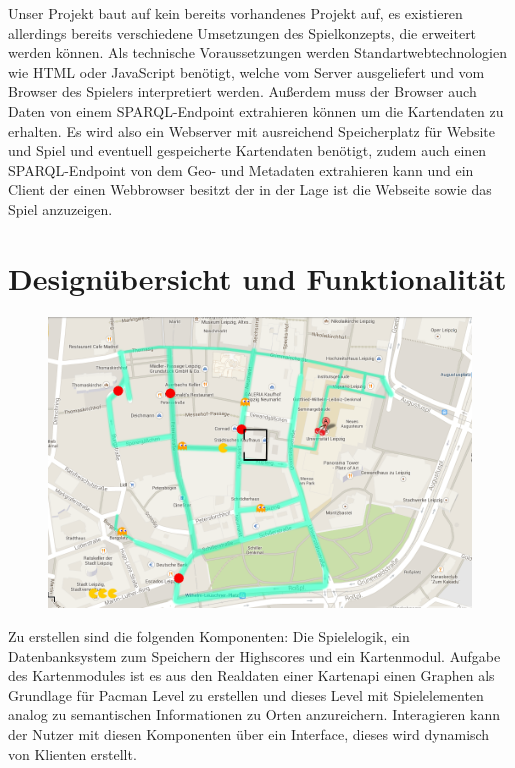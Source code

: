 \documentclass[11pt,a4paper]{article}
\begin{document}
Unser Projekt baut auf kein bereits vorhandenes Projekt auf, es existieren allerdings bereits
verschiedene Umsetzungen des Spielkonzepts, die erweitert werden können. Als technische
Voraussetzungen werden Standartwebtechnologien wie HTML oder JavaScript benötigt, welche vom
Server ausgeliefert und vom Browser des Spielers interpretiert werden. Außerdem muss der Browser
auch Daten von einem SPARQL-Endpoint extrahieren können um die Kartendaten zu erhalten.
Es wird also ein Webserver mit ausreichend Speicherplatz für Website und Spiel und eventuell
gespeicherte Kartendaten benötigt, zudem auch einen SPARQL-Endpoint von dem Geo- und
Metadaten extrahieren kann und ein Client der einen Webbrowser besitzt der in der Lage ist die
Webseite sowie das Spiel anzuzeigen.

\clearpage
\section{Designübersicht und Funktionalität}
\begin{figure}[htb]
  \centering
  \includegraphics[scale=0.3]{pacman.png}
  \label{PNFs}
\end{figure} 

Zu erstellen sind die folgenden Komponenten: Die Spielelogik, ein Datenbanksystem zum Speichern der Highscores und ein Kartenmodul. Aufgabe des Kartenmodules ist es aus den Realdaten einer Kartenapi einen Graphen als Grundlage für Pacman Level zu erstellen und dieses Level mit Spielelementen analog zu semantischen Informationen zu Orten anzureichern. Interagieren kann der Nutzer mit diesen Komponenten über ein Interface, dieses wird dynamisch von Klienten erstellt.
\end{document}
